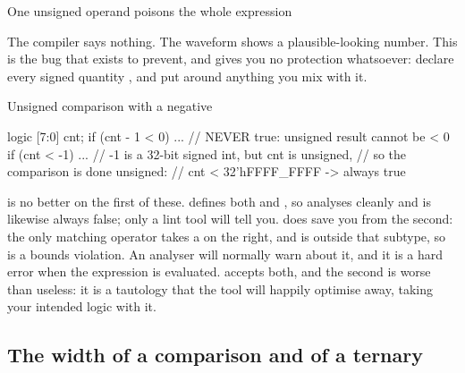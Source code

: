 \begin{gotcha}{One unsigned operand poisons the whole expression}
The compiler says nothing. The waveform shows a plausible-looking number. This
is the bug that  exists to prevent, and \SV{} gives you no
protection whatsoever: declare every signed quantity , and
put  around anything you mix with it.
\end{gotcha}

\begin{gotcha}{Unsigned comparison with a negative}
\begin{svcode}
logic [7:0] cnt;
if (cnt - 1 < 0)   ...     // NEVER true: unsigned result cannot be < 0
if (cnt < -1)      ...     // -1 is a 32-bit signed int, but cnt is unsigned,
                           // so the comparison is done unsigned:
                           // cnt < 32'hFFFF_FFFF -> always true
\end{svcode}
\VHDL{} is no better on the first of these.  defines both
 and , so
 analyses cleanly and is likewise always false; only a lint
tool will tell you. \VHDL{} does save you from the second: the only matching
operator takes a  on the right, and  is outside that
subtype, so  is a bounds violation. An analyser will normally
warn about it, and it is a hard error when the expression is
evaluated. \SV{} accepts both, and the second
is worse than useless: it is a tautology that the tool will happily optimise
away, taking your intended logic with it.
\end{gotcha}

\subsection{The width of a comparison and of a ternary}


